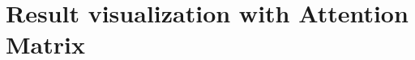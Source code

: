 \documentclass[preprint,12pt]{elsarticle}
\begin{document}
\section{Result visualization with Attention Matrix}
\label{S:4}













\end{document}
